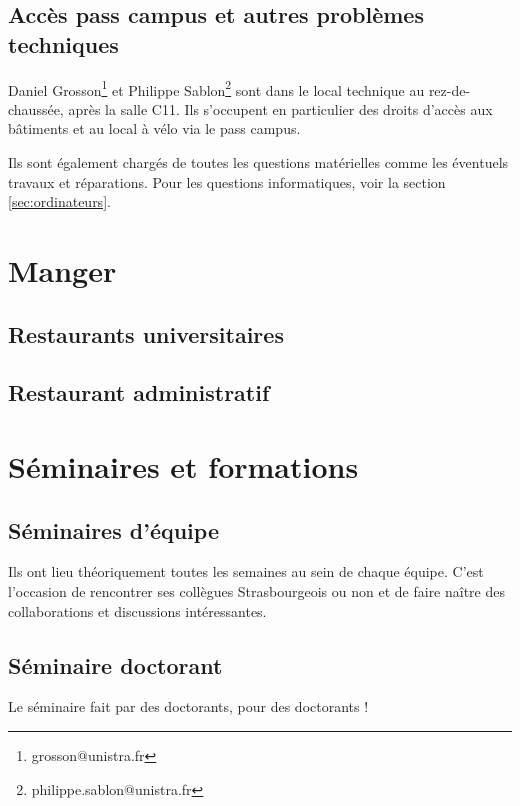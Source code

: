 \documentclass[a5paper]{article}
\begin{document}
\subsection{Accès pass campus et autres problèmes techniques}
\label{subsec:technique}

Daniel Grosson\footnote{grosson@unistra.fr} et Philippe Sablon\footnote{philippe.sablon@unistra.fr} sont dans le local technique au rez-de-chaussée, après la salle C11. Ils s'occupent en particulier des droits d'accès aux bâtiments et au local à vélo via le pass campus.


Ils sont également chargés de toutes les questions matérielles comme les éventuels travaux et réparations. Pour les questions informatiques, voir la section \ref{sec:ordinateurs}.
\section{Manger}
\label{sec:manger}

\subsection{Restaurants universitaires}
\label{sec:rest-univ}

\subsection{Restaurant administratif}
\label{subsec:rest-admin}

\section{Séminaires et formations}
\label{sec:seminaires-et}

\subsection{Séminaires d'équipe}
\label{subsec:seminaires-dequipe}

Ils ont lieu théoriquement toutes les semaines au sein de chaque équipe. C'est l'occasion de rencontrer ses collègues Strasbourgeois ou non et de faire naître des collaborations et discussions intéressantes.

\subsection{Séminaire doctorant}
\label{subsec:seminaire-doctorant}

Le séminaire fait par des doctorants, pour des doctorants !
\end{document}
